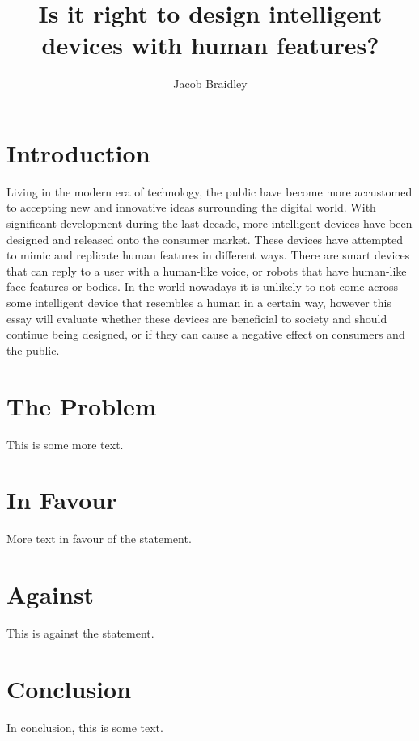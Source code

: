 \documentclass{article}
\title{Is it right to design intelligent devices with human features?}
\author{Jacob Braidley}
\date{}
\begin{document}
\maketitle

\vspace{0.5cm}

\section{Introduction}
Living in the modern era of technology, the public have become more accustomed to accepting new and innovative ideas surrounding the digital world. With significant development during the last decade, more intelligent devices have been designed and released onto the consumer market. These devices have attempted to mimic and replicate human features in different ways. There are smart devices that can reply to a user with a human-like voice, or robots that have human-like face features or bodies. In the world nowadays it is unlikely to not come across some intelligent device that resembles a human in a certain way, however this essay will evaluate whether these devices are beneficial to society and should continue being designed, or if they can cause a negative effect on consumers and the public.

\section{The Problem}
This is some more text.

\section{In Favour}
More text in favour of the statement.

\section{Against}
This is against the statement.

\section{Conclusion}
In conclusion, this is some text.\cite{example2022example}

\vspace{.5cm}



\end{document}
